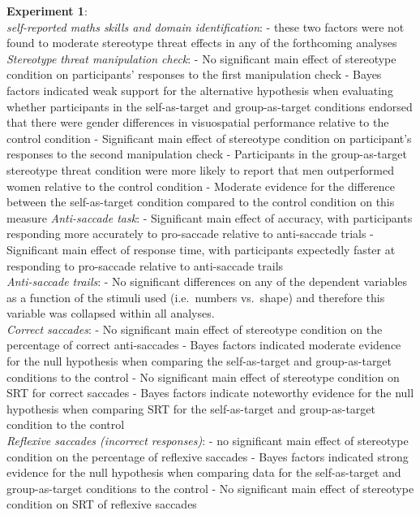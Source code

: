 \documentclass[
  doc, a4paper]{apa7}
\begin{document}
\textbf{Experiment 1}:\\
\emph{self-reported maths skills and domain identification}:
- these two factors were not found to moderate stereotype threat effects in any of the forthcoming analyses\\
\emph{Stereotype threat manipulation check}:
- No significant main effect of stereotype condition on participants' responses to the first manipulation check
- Bayes factors indicated weak support for the alternative hypothesis when evaluating whether participants in the self-as-target and group-as-target conditions endorsed that there were gender differences in visuospatial performance relative to the control condition
- Significant main effect of stereotype condition on participant's responses to the second manipulation check
- Participants in the group-as-target stereotype threat condition were more likely to report that men outperformed women relative to the control condition
- Moderate evidence for the difference between the self-as-target condition compared to the control condition on this measure
\emph{Anti-saccade task}:
- Significant main effect of accuracy, with participants responding more accurately to pro-saccade relative to anti-saccade trials
- Significant main effect of response time, with participants expectedly faster at responding to pro-saccade relative to anti-saccade trails\\
\emph{Anti-saccade trails}:
- No significant differences on any of the dependent variables as a function of the stimuli used (i.e.~numbers vs.~shape) and therefore this variable was collapsed within all analyses.\\
\emph{Correct saccades}:
- No significant main effect of stereotype condition on the percentage of correct anti-saccades
- Bayes factors indicated moderate evidence for the null hypothesis when comparing the self-as-target and group-as-target conditions to the control
- No significant main effect of stereotype condition on SRT for correct saccades
- Bayes factors indicate noteworthy evidence for the null hypothesis when comparing SRT for the self-as-target and group-as-target condition to the control\\
\emph{Reflexive saccades (incorrect responses)}:
- no significant main effect of stereotype condition on the percentage of reflexive saccades
- Bayes factors indicated strong evidence for the null hypothesis when comparing data for the self-as-target and group-as-target conditions to the control
- No significant main effect of stereotype condition on SRT of reflexive saccades
\end{document}
